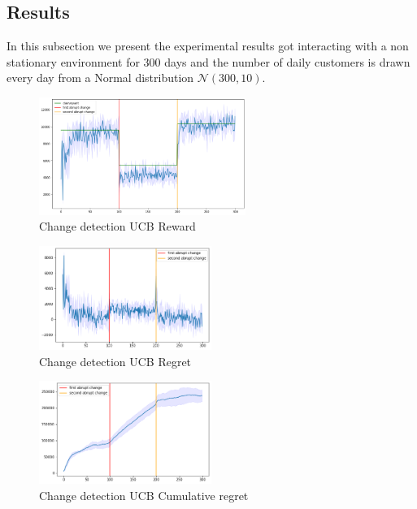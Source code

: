 \subsection{Results}
In this subsection we present the experimental results got interacting with a non stationary environment for 300 days and the number of daily customers is drawn every day from a Normal distribution $\mathcal{N}(300, 10)$.
\begin{figure}[ht]
    \begin{center}
    \includegraphics[width=0.6\textwidth]{img/rewards_active2.png}
    \caption{Change detection UCB Reward}
    \label{fig:reward61}
    \end{center}
\end{figure}
\begin{multicols}{2}
    \begin{figure}[H]
        \begin{center}
        \includegraphics[width=0.5\textwidth]{img/regret_active2.png}
        \caption{Change detection UCB Regret}
        \label{fig:regret61}
        \end{center}
    \end{figure}
    \columnbreak
    \begin{figure}[H]
        \begin{center}
        \includegraphics[width=0.5\textwidth]{img/cumulative_regret_active2.png}
        \caption{Change detection UCB Cumulative regret}
        \label{fig:cum_reg61}
        \end{center}
    \end{figure}
\end{multicols}

